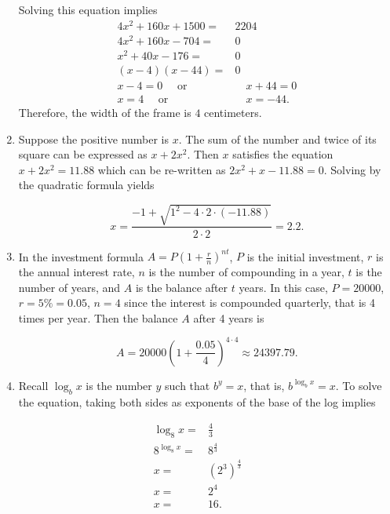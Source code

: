 \documentclass[
  12pt]{article}
\begin{document}
\begin{enumerate}
  Solving this equation implies \[
  \begin{aligned}
  4x^2+160x+1500=&2204\\
  4x^2+160x-704=&0\\
  x^2+40x-176=&0\\
  (x-4)(x-44)=&0\\
  x-4=0\quad\text{ or}&\quad x+44=0\\
  x=4\quad\text{ or}&\quad x=-44.
  \end{aligned}
  \] Therefore, the width of the frame is \(4\) centimeters.
\item
  Suppose the positive number is \(x\). The sum of the number and twice
  of its square can be expressed as \(x+2x^2\). Then \(x\) satisfies the
  equation \(x+2x^2=11.88\) which can be re-written as
  \(2x^2+x-11.88=0\). Solving by the quadratic formula yields

  \[x=\frac{-1+\sqrt{1^2-4\cdot 2\cdot (-11.88)}}{2\cdot 2}=2.2.\]
\item
  In the investment formula \(A=P(1+\frac{r}{n})^{nt}\), \(P\) is the
  initial investment, \(r\) is the annual interest rate, \(n\) is the
  number of compounding in a year, \(t\) is the number of years, and
  \(A\) is the balance after \(t\) years. In this case, \(P=20000\),
  \(r=5\%=0.05\), \(n=4\) since the interest is compounded quarterly,
  that is 4 times per year. Then the balance \(A\) after 4 years is

  \[A=20000\left(1+\frac{0.05}{4}\right)^{4\cdot 4}\approx 24397.79.\]
\item
  Recall \(\log_bx\) is the number \(y\) such that \(b^y=x\), that is,
  \(b^{\log_bx}=x\). To solve the equation, taking both sides as
  exponents of the base of the log implies
\end{enumerate}

\[
\begin{aligned}
\log_8x=&\frac43\\
8^{\log_8x}=&8^{\frac43}\\
x=&(2^3)^{\frac43}\\
x=&2^4\\
x=&16.
\end{aligned}
\]
\end{document}
